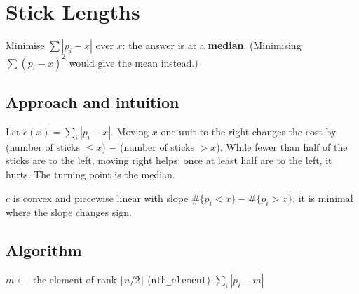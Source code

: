 \section{Stick Lengths}
\label{sec:g-stick-lengths}


\begin{patternbox}
Minimise $\sum|p_i-x|$ over $x$: the answer is at a \textbf{median}.
(Minimising $\sum(p_i-x)^2$ would give the mean instead.)
\end{patternbox}

\subsection*{Approach and intuition}

Let $c(x)=\sum_i |p_i-x|$. Moving $x$ one unit to the right changes the cost
by (number of sticks $\le x$) $-$ (number of sticks $>x$). While fewer than
half of the sticks are to the left, moving right helps; once at least half are
to the left, it hurts. The turning point is the median.

\begin{center}
\end{center}

\noindent $c$ is convex and piecewise linear with slope
$\#\{p_i<x\}-\#\{p_i>x\}$; it is minimal where the slope changes sign.

\subsection*{Algorithm}
\begin{algorithmic}[1]
\State $m\gets$ the element of rank $\lfloor n/2\rfloor$ (\texttt{nth\_element})
\State \Return $\sum_i |p_i-m|$
\end{algorithmic}

